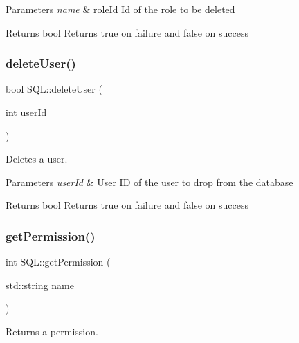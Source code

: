\begin{DoxyParams}{Parameters}
{\em name} & role\+Id Id of the role to be deleted \\
\hline
\end{DoxyParams}
\begin{DoxyReturn}{Returns}
{\ttfamily bool} Returns true on failure and false on success 
\end{DoxyReturn}
\mbox{\label{class_s_q_l_af6d3aa26b727b7667e8e286c4640733d}} 
\subsubsection{\texorpdfstring{delete\+User()}{deleteUser()}}
{\footnotesize\ttfamily bool S\+Q\+L\+::delete\+User (\begin{DoxyParamCaption}\item[{int}]{user\+Id }\end{DoxyParamCaption})}



Deletes a user. 


\begin{DoxyParams}{Parameters}
{\em user\+Id} & User ID of the user to drop from the database \\
\hline
\end{DoxyParams}
\begin{DoxyReturn}{Returns}
{\ttfamily bool} Returns true on failure and false on success 
\end{DoxyReturn}
\mbox{\label{class_s_q_l_aa1a27ec895faa8c45dabdd80c558c2d7}} 
\subsubsection{\texorpdfstring{get\+Permission()}{getPermission()}\hspace{0.1cm}{\footnotesize\ttfamily [1/2]}}
{\footnotesize\ttfamily int S\+Q\+L\+::get\+Permission (\begin{DoxyParamCaption}\item[{std\+::string}]{name }\end{DoxyParamCaption})}



Returns a permission. 


